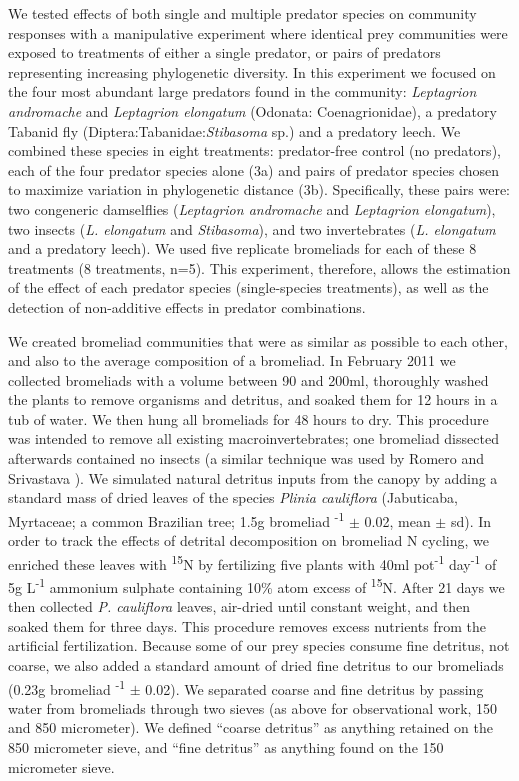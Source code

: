 We tested effects of both single and multiple predator species on
community responses with a manipulative experiment where identical prey
communities were exposed to treatments of either a single predator, or
pairs of predators representing increasing phylogenetic diversity. In
this experiment we focused on the four most abundant large predators
found in the community: \emph{Leptagrion andromache} and
\emph{Leptagrion elongatum} (Odonata: Coenagrionidae), a predatory
Tabanid fly (Diptera:Tabanidae:\emph{Stibasoma} sp.) and a predatory
leech. We combined these species in eight treatments: predator-free
control (no predators), each of the four predator species alone (3a) and
pairs of predator species chosen to maximize variation in phylogenetic
distance (3b). Specifically, these pairs were: two congeneric
damselflies (\emph{Leptagrion andromache} and \emph{Leptagrion
elongatum}), two insects (\emph{L. elongatum} and \emph{Stibasoma}), and
two invertebrates (\emph{L. elongatum} and a predatory leech). We used
five replicate bromeliads for each of these 8 treatments (8 treatments,
n=5). This experiment, therefore, allows the estimation of the effect of
each predator species (single-species treatments), as well as the
detection of non-additive effects in predator combinations.

We created bromeliad communities that were as similar as possible to
each other, and also to the average composition of a bromeliad. In
February 2011 we collected bromeliads with a volume between 90 and
200ml, thoroughly washed the plants to remove organisms and detritus,
and soaked them for 12 hours in a tub of water. We then hung all
bromeliads for 48 hours to dry. This procedure was intended to remove
all existing macroinvertebrates; one bromeliad dissected afterwards
contained no insects (a similar technique was used by Romero and
Srivastava \citeyearpar{Romero2010}). We simulated natural detritus
inputs from the canopy by adding a standard mass of dried leaves of the
species \emph{Plinia cauliflora} (Jabuticaba, Myrtaceae; a common
Brazilian tree; 1.5g bromeliad \textsuperscript{-1} $\pm$ 0.02, mean $\pm$ sd).
In order to track the effects of detrital decomposition on bromeliad N
cycling, we enriched these leaves with \textsuperscript{15}N by
fertilizing five plants with 40ml pot\textsuperscript{-1}
day\textsuperscript{-1} of 5g L\textsuperscript{-1} ammonium sulphate
containing 10\% atom excess of \textsuperscript{15}N. After 21 days we
then collected \emph{P. cauliflora} leaves, air-dried until constant
weight, and then soaked them for three days. This procedure removes
excess nutrients from the artificial fertilization. Because some of our
prey species consume fine detritus, not coarse, we also added a standard
amount of dried fine detritus to our bromeliads (0.23g bromeliad
\textsuperscript{-1} $\pm$ 0.02). We separated coarse and fine detritus by
passing water from bromeliads through two sieves (as above for
observational work, 150 and 850 micrometer). We defined ``coarse detritus'' as
anything retained on the 850 micrometer sieve, and ``fine detritus'' as anything
found on the 150 micrometer sieve.

